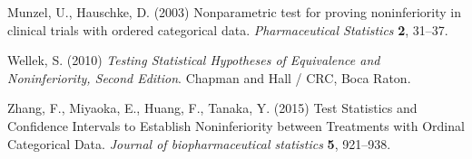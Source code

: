 \documentclass[bimj,fleqn]{w-art}\usepackage[]{graphicx}\usepackage[]{color}
\theoremstyle{plain}
\theoremstyle{definition}
\providecommand{\DIFdelbegin}{} %
\providecommand{\DIFdelend}{} %
\newcommand{\DIFscaledelfig}{0.5}
\newlength{\DIFdelgraphicswidth} %
\newlength{\DIFdelgraphicsheight} %
\newcommand{\DIFdelincludegraphics}[2][]{%
\sbox{\DIFdelgraphicsbox}{\DIFOincludegraphics[#1]{#2}}%
\settoboxwidth{\DIFdelgraphicswidth}{\DIFdelgraphicsbox} %
\settoboxtotalheight{\DIFdelgraphicsheight}{\DIFdelgraphicsbox} %
\scalebox{\DIFscaledelfig}{%
\parbox[b]{\DIFdelgraphicswidth}{\usebox{\DIFdelgraphicsbox}\\[-\baselineskip] \rule{\DIFdelgraphicswidth}{0em}}\llap{\resizebox{\DIFdelgraphicswidth}{\DIFdelgraphicsheight}{%
\setlength{\unitlength}{\DIFdelgraphicswidth}%
\begin{picture}(1,1)%
\thicklines\linethickness{2pt} %
{\color[rgb]{1,0,0}\put(0,0){\framebox(1,1){}}}%
{\color[rgb]{1,0,0}\put(0,0){\line( 1,1){1}}}%
{\color[rgb]{1,0,0}\put(0,1){\line(1,-1){1}}}%
\end{picture}%
}\hspace*{3pt}}} %
} %
\DeclareRobustCommand{\DIFdelbegin}{\DIFOdelbegin \let\includegraphics\DIFdelincludegraphics} %
\DeclareRobustCommand{\DIFdelend}{\DIFOaddend \let\includegraphics\DIFOincludegraphics} %
\begin{document}
\begin{thebibliography}{10}
Munzel, U., Hauschke, D. (2003) Nonparametric test for proving noninferiority in clinical trials with ordered categorical data.
\textit{Pharmaceutical Statistics} \textbf{2}, 31--37.

Wellek, S. (2010) \textit{Testing Statistical Hypotheses of Equivalence and
Noninferiority, Second Edition}.
Chapman and Hall / CRC, Boca Raton.

Zhang, F., Miyaoka, E., Huang, F.,  Tanaka, Y. (2015)  Test Statistics and
Confidence Intervals to Establish Noninferiority between Treatments with Ordinal
Categorical Data. \textit{Journal of biopharmaceutical statistics} \textbf{5}, 921--938.
\DIFdelbegin %

\DIFdelend 


\end{thebibliography}
\phantom{aaaa}
\end{document}
